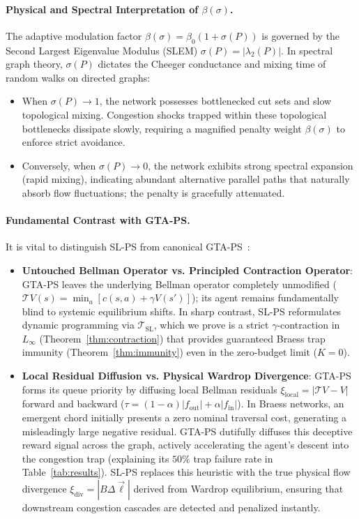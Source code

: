 \documentclass[11pt,a4paper]{article}
\begin{document}
\paragraph{Physical and Spectral Interpretation of $\beta(\sigma)$.}
The adaptive modulation factor $\beta(\sigma) = \beta_0 (1 + \sigma(P))$ is governed by the Second Largest Eigenvalue Modulus (SLEM) $\sigma(P) = |\lambda_2(P)|$. In spectral graph theory, $\sigma(P)$ dictates the Cheeger conductance and mixing time of random walks on directed graphs:
\begin{itemize}
    \item When $\sigma(P) \to 1$, the network possesses bottlenecked cut sets and slow topological mixing. Congestion shocks trapped within these topological bottlenecks dissipate slowly, requiring a magnified penalty weight $\beta(\sigma)$ to enforce strict avoidance.
    \item Conversely, when $\sigma(P) \to 0$, the network exhibits strong spectral expansion (rapid mixing), indicating abundant alternative parallel paths that naturally absorb flow fluctuations; the penalty is gracefully attenuated.
\end{itemize}

\paragraph{Fundamental Contrast with GTA-PS.}
It is vital to distinguish SL-PS from canonical GTA-PS~\cite{gta_ps2025}:
\begin{itemize}
    \item \textbf{Untouched Bellman Operator vs. Principled Contraction Operator}: GTA-PS leaves the underlying Bellman operator completely unmodified ($\mathcal{T}V(s) = \min_a [c(s, a) + \gamma V(s')]$); its agent remains fundamentally blind to systemic equilibrium shifts. In sharp contrast, SL-PS reformulates dynamic programming via $\mathcal{T}_{\text{SL}}$, which we prove is a strict $\gamma$-contraction in $L_\infty$ (Theorem~\ref{thm:contraction}) that provides guaranteed Braess trap immunity (Theorem~\ref{thm:immunity}) even in the zero-budget limit ($K = 0$).
    \item \textbf{Local Residual Diffusion vs. Physical Wardrop Divergence}: GTA-PS forms its queue priority by diffusing local Bellman residuals $\xi_{\text{local}} = |\mathcal{T}V - V|$ forward and backward ($\tau = (1-\alpha) |f_{\text{out}}| + \alpha |f_{\text{in}}|$). In Braess networks, an emergent chord initially presents a zero nominal traversal cost, generating a misleadingly large negative residual. GTA-PS dutifully diffuses this deceptive reward signal across the graph, actively accelerating the agent's descent into the congestion trap (explaining its $50\%$ trap failure rate in Table~\ref{tab:results}). SL-PS replaces this heuristic with the true physical flow divergence $\xi_{\text{div}} = |B \Delta \vec{\ell}|$ derived from Wardrop equilibrium, ensuring that downstream congestion cascades are detected and penalized instantly.
\end{itemize}
\end{document}
